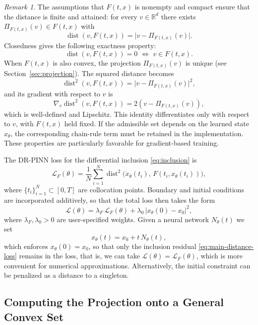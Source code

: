 \documentclass[11pt]{elsarticle}
\theoremstyle{definition}
\theoremstyle{remark}
\newtheorem{remark}[theorem]{Remark}
\numberwithin{equation}{section}
\def\dist{\operatorname{dist}}
\begin{document}
	\begin{remark}
		The assumptions that $F(t,x)$ is nonempty and compact ensure that the
		distance is finite and attained: for every $v\in\mathbb{R}^d$ there
		exists $\Pi_{F(t,x)}(v)\in F(t,x)$ with
		\[
		\dist(v,F(t,x))=\bigl|v-\Pi_{F(t,x)}(v)\bigr|.
		\]
		Closedness gives the following exactness property:
		\[
		\dist(v,F(t,x))=0 \,\,\iff\,\, v\in F(t,x).
		\]
		When $F(t,x)$ is also convex,
		the projection $\Pi_{F(t,x)}(v)$ is unique (see Section~\ref{sec:projection}).
		The squared distance becomes
		\begin{equation}\label{loss:distance}
			\dist^2(v,F(t,x))=\bigl|v-\Pi_{F(t,x)}(v)\bigr|^2,
		\end{equation}
		and its gradient with respect to $v$ is
		\[
		\nabla_v\dist^2(v,F(t,x))=2(v-\Pi_{F(t,x)}(v)),
		\]
		which is well-defined and Lipschitz. This identity differentiates
		only with respect to $v$, with $F(t,x)$ held fixed. If the admissible
		set depends on the learned state $x_\theta$, the corresponding chain-rule
		term must be retained in the implementation. These properties are
		particularly favorable for gradient-based training.
	\end{remark}
	
	The DR-PINN loss for the differential inclusion \eqref{eq:inclusion} is
	\begin{equation}\label{eq:main-distance-loss}
		\mathcal{L}_F(\theta)
		=
		\frac{1}{N}\sum_{i=1}^{N}
		\dist^2\bigl(\dot{x}_\theta(t_i),\,F(t_i,x_\theta(t_i))\bigr),
	\end{equation}
	where $\{t_i\}_{i=1}^N\subset[0,T]$ are collocation points.  Boundary
	and initial conditions are incorporated additively, so that
	the total loss then takes the form
	\[
	\mathcal{L}(\theta)
	=
	\lambda_F\,\mathcal{L}_F(\theta)
	+
	\lambda_0\,|x_\theta(0)-x_0|^2,
	\]
	where $\lambda_F,\lambda_0>0$ are user-specified weights.
	Given a neural network $N_\theta(t)$ we set
	\[
	x_\theta(t)=x_0+t\,N_\theta(t),
	\]
	which enforces $x_\theta(0)=x_0$, so that only the inclusion residual
	\eqref{eq:main-distance-loss} remains in the loss, that is, we can take
	$\mathcal{L}(\theta) = \mathcal{L}_F(\theta)$,
	which is more convenient for numerical approximations.
	Alternatively, the
	initial constraint can be penalized as a distance to a singleton.
	
	
	
	\subsection{Computing the Projection onto a General Convex Set}
	\label{sec:projection-extreme-points}
	
\end{document}
